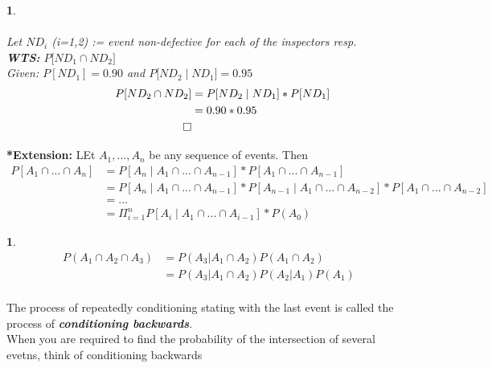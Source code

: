 \documentclass[11pt]{article}
\newtheorem*{solution}{\framebox{Sol}}
\newtheorem{example}{\framebox{Ex}}[section]
\newcommand\tab[1][1cm]{\hspace*{#1}}
\begin{document}
            \begin{solution} \tab 
                \\
                \\Let $ND_i $ (i=1,2) := event non-defective for each of the inspectors resp.\\
                \textbf{WTS:} $P\big[ND_1 \cap ND_2 \big]$ \\
                Given: $P[ND_1] = 0.90$ and $P\big[ND_2 \mid ND_1 \big] = 0.95$ \\
                \begin{align*}
                    P[ND_2 \cap ND_2] &= P[ND_2 \mid ND_1]* P[ND_1] \\
                                        & = 0.90 * 0.95 \\
                \tab \tab \tab \square
                \end{align*}
            \end{solution}
            \textbf{*Extension: } LEt $A_1 , ..., A_n$ be any sequence of events. Then 
            \begin{align*}
                P[A_1 \cap ... \cap A_n] &= P[A_n \mid A_1 \cap ... \cap A_{n-1}]*P[A_1\cap ... \cap A_{n-1}]\\
                                            &= P[A_n \mid A_1 \cap ... \cap A_{n-1}] * P[A_{n-1} \mid A_1 \cap ... \cap A_{n-2}]*P[A_1\cap ... \cap A_{n-2}]\\
                                            &= ...\\
                                            &= \Pi_{i=1}^n P[A_i \mid  A_1 \cap ... \cap A_{i-1}]*P(A_0) \tag{i=1,...,n}
            \end{align*}
            \begin{example}\tab \\
                \begin{align*}
                    P (A_1 \cap A_2 \cap A_3)   &= P(A_3 | A_1 \cap A_2) P(A_1 \cap A_2) \\
                                                &= P(A_3 | A_1 \cap A_2) P(A_2 |A_1) P(A_1) \\
                \end{align*}
            \end{example}
            The process of repeatedly conditioning stating with the last event is called the process of \textbf{\textit{conditioning backwards}}.\\
            When you are required to find the probability of the intersection of several evetns, think of conditioning backwards
    \newpage
\end{document}
